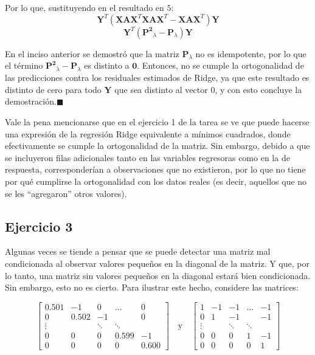 \documentclass[11pt]{article}
\begin{document}
Por lo que, sustituyendo en el resultado en \(5\):
\[\mathbf{Y}^T \left(\mathbf{X}\mathbf{A}\mathbf{X}^T\mathbf{X}\mathbf{A}\mathbf{X}^T -\mathbf{X}\mathbf{A}\mathbf{X}^T\right)\mathbf{Y}\]
\[\mathbf{Y}^T \left(\mathbf{P^2}_\lambda -\mathbf{P}_\lambda\right)\mathbf{Y}\]

En el inciso anterior se demostró que la matriz \(\mathbf{P}_\lambda\)
no es idempotente, por lo que el término
\(\mathbf{P^2}_\lambda -\mathbf{P}_\lambda\) es distinto a
\(\mathbf{0}\). Entonces, no se cumple la ortogonalidad de las
predicciones contra los residuales estimados de Ridge, ya que este
resultado es distinto de cero para todo \(\mathbf{Y}\) que sea distinto
al vector 0, y con esto concluye la demostración.\(\blacksquare\)

Vale la pena mencionarse que en el ejercicio 1 de la tarea se ve que
puede hacerse una expresión de la regresión Ridge equivalente a mínimos
cuadrados, donde efectivamente se cumple la ortogonalidad de la matriz.
Sin embargo, debido a que se incluyeron filas adicionales tanto en las
variables regresoras como en la de respuesta, corresponderían a
observaciones que no existieron, por lo que no tiene por qué cumplirse
la ortogonalidad con los datos reales (es decir, aquellos que no se les
``agregaron'' otros valores).

    \hypertarget{ejercicio-3}{%
\subsection{Ejercicio 3}\label{ejercicio-3}}

Algunas veces se tiende a pensar que se puede detectar una matriz mal
condicionada al observar valores pequeños en la diagonal de la matriz. Y
que, por lo tanto, una matriz sin valores pequeños en la diagonal estará
bien condicionada. Sin embargo, esto no es cierto. Para ilustrar este
hecho, considere las matrices:

\[
\begin{bmatrix}
0.501 & -1    & 0      & ...   & 0  \\
0     & 0.502 & -1     &       & 0  \\
\vdots&       & \ddots & \ddots &  \\
0     & 0     & 0      & 0.599 & -1 \\
0     & 0     & 0      & 0     & 0.600
\end{bmatrix} 
\quad \mathrm{y} \quad 
\begin{bmatrix}
1 & -1 & -1     & ...  & -1  \\
0 & 1  & -1     &      & -1 \\
\vdots &   & \ddots & \ddots  & \\
0 & 0  & 0      & 1    & -1 \\
0 & 0  & 0      & 0    & 1
\end{bmatrix}
\]
\end{document}
